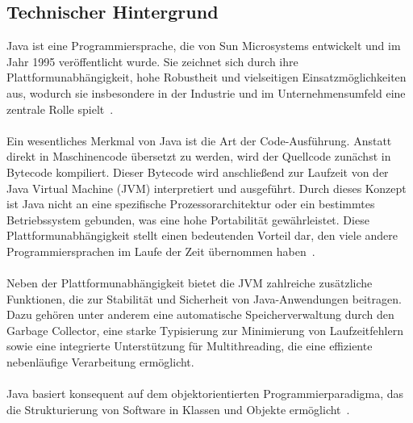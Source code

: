 \documentclass[11pt]{article}
\begin{document}
    \subsection{Technischer Hintergrund}
    Java ist eine Programmiersprache, die von Sun Microsystems entwickelt und im Jahr 1995 veröffentlicht wurde.
    Sie zeichnet sich durch ihre Plattformunabhängigkeit, hohe Robustheit und vielseitigen Einsatzmöglichkeiten aus, wodurch sie insbesondere in der Industrie und im Unternehmensumfeld eine zentrale Rolle spielt~\cite[55]{insel}.\\
    \\
    Ein wesentliches Merkmal von Java ist die Art der Code-Ausführung.
    Anstatt direkt in Maschinencode übersetzt zu werden, wird der Quellcode zunächst in Bytecode kompiliert.
    Dieser Bytecode wird anschließend zur Laufzeit von der Java Virtual Machine (JVM) interpretiert und ausgeführt.
    Durch dieses Konzept ist Java nicht an eine spezifische Prozessorarchitektur oder ein bestimmtes Betriebssystem gebunden, was eine hohe Portabilität gewährleistet.
    Diese Plattformunabhängigkeit stellt einen bedeutenden Vorteil dar, den viele andere Programmiersprachen im Laufe der Zeit übernommen haben~\cite[52]{insel}.\\
    \\
    Neben der Plattformunabhängigkeit bietet die JVM zahlreiche zusätzliche
    Funktionen, die zur Stabilität und Sicherheit von Java-Anwendungen beitragen.
    Dazu gehören unter anderem eine automatische Speicherverwaltung
    durch den Garbage Collector, eine starke Typisierung zur Minimierung
    von Laufzeitfehlern sowie eine integrierte Unterstützung für Multithreading,
    die eine effiziente nebenläufige Verarbeitung ermöglicht\cite[51 - 55]{insel}.\\
    \\
    Java basiert konsequent auf dem objektorientierten Programmierparadigma, das die Strukturierung von Software in Klassen und Objekte ermöglicht~\cite[54]{insel}. \\
    \\
\end{document}
